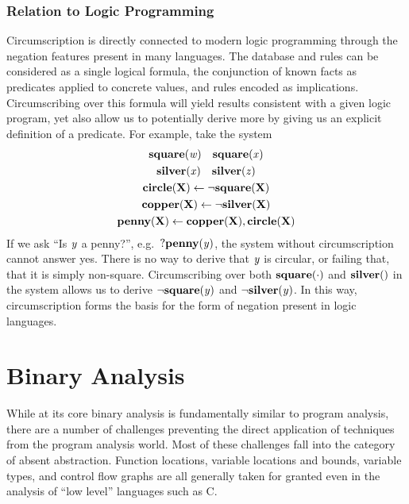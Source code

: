 \subsubsection{Relation to Logic Programming}
Circumscription is directly connected to modern logic programming through the negation features present in many languages.
The database and rules can be considered as a single logical formula, the conjunction of known facts as predicates applied to concrete values, and rules encoded as implications.
Circumscribing over this formula will yield results consistent with a given logic program, yet also allow us to potentially derive more by giving us an explicit definition of a predicate.
For example, take the system
\begin{gather*}
        {\bf square}({\it w}) \quad {\bf square}({\it x})\\
        {\bf silver}({\it x}) \quad {\bf silver}({\it z})\\
        {\bf circle}({\bf X}) \leftarrow \neg {\bf square}({\bf X})\\
        {\bf copper}({\bf X}) \leftarrow \neg {\bf silver}({\bf X})\\
        {\bf penny}({\bf X}) \leftarrow {\bf copper}({\bf X}), {\bf circle}({\bf X})\\
\end{gather*}
If we ask ``Is ${\it y}$ a penny?'', e.g.\ $?{\bf penny}({\it y})$, the system without circumscription cannot answer yes.
There is no way to derive that ${\it y}$ is circular, or failing that, that it is simply non-square.
Circumscribing over both ${\bf square}(\cdot)$ and $\pred{silver}$ in the system allows us to derive $\neg {\bf square}({\it y})$ and $\neg {\bf silver}({\it y})$.
In this way, circumscription forms the basis for the form of negation present in logic languages.

\section{Binary Analysis}
While at its core binary analysis is fundamentally similar to program analysis, there are a number of challenges preventing the direct application of techniques from the program analysis world.
Most of these challenges fall into the category of absent abstraction.
Function locations, variable locations and bounds, variable types, and control flow graphs are all generally taken for granted even in the analysis of ``low level'' languages such as C.

